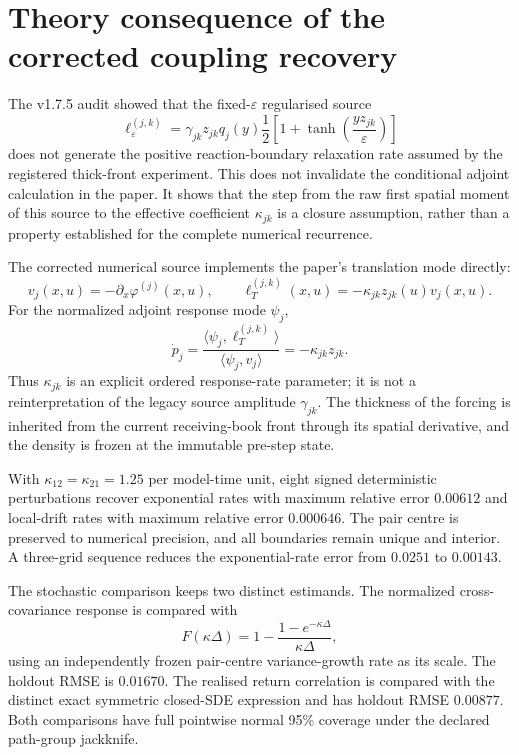 
\section*{Theory consequence of the corrected coupling recovery}

The v1.7.5 audit showed that the fixed-$\varepsilon$ regularised source
\[
  \ell_\varepsilon^{(j,k)}
  =\gamma_{jk}z_{jk}q_j(y)
  \frac{1}{2}\left[1+\tanh\left(\frac{yz_{jk}}{\varepsilon}\right)\right]
\]
does not generate the positive reaction-boundary relaxation rate assumed by
the registered thick-front experiment.  This does not invalidate the
conditional adjoint calculation in the paper.  It shows that the step from the
raw first spatial moment of this source to the effective coefficient
$\kappa_{jk}$ is a closure assumption, rather than a property established for
the complete numerical recurrence.

The corrected numerical source implements the paper's translation mode
directly:
\[
  v_j(x,u)=-\partial_x\varphi^{(j)}(x,u),
  \qquad
  \ell_T^{(j,k)}(x,u)
  =-\kappa_{jk}z_{jk}(u)v_j(x,u).
\]
For the normalized adjoint response mode $\psi_j$,
\[
  \dot p_j
  =\frac{\langle\psi_j,\ell_T^{(j,k)}\rangle}
  {\langle\psi_j,v_j\rangle}
  =-\kappa_{jk}z_{jk}.
\]
Thus $\kappa_{jk}$ is an explicit ordered response-rate parameter; it is not a
reinterpretation of the legacy source amplitude $\gamma_{jk}$.  The thickness
of the forcing is inherited from the current receiving-book front through its
spatial derivative, and the density is frozen at the immutable pre-step
state.

With $\kappa_{12}=\kappa_{21}=1.25$ per model-time unit, eight signed
deterministic perturbations recover exponential rates with maximum relative
error $0.00612$ and local-drift rates with maximum relative error $0.000646$.
The pair centre is preserved to numerical precision, and all boundaries remain
unique and interior.  A three-grid sequence reduces the exponential-rate error
from $0.0251$ to $0.00143$.

The stochastic comparison keeps two distinct estimands.  The normalized
cross-covariance response is compared with
\[
  F(\kappa\Delta)
  =1-\frac{1-e^{-\kappa\Delta}}{\kappa\Delta},
\]
using an independently frozen pair-centre variance-growth rate as its scale.
The holdout RMSE is $0.01670$.  The realised return correlation is compared
with the distinct exact symmetric closed-SDE expression and has holdout RMSE
$0.00877$.  Both comparisons have full pointwise normal 95\% coverage under
the declared path-group jackknife.

